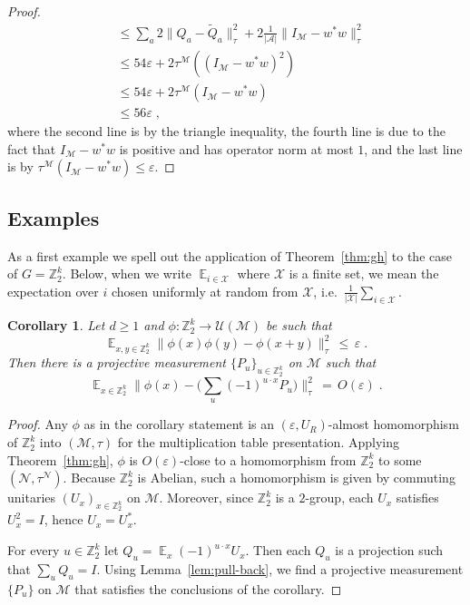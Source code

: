 \documentclass[11pt]{article}
\newtheorem{corollary}[theorem]{Corollary}
\theoremstyle{definition}
\newcommand{\Id}{\ensuremath{I}}
\DeclareMathOperator*{\Expectation}{\mathbb{E}}
\newcommand{\Es}[1]{\Expectation_{#1}}
\newcommand{\C}{\ensuremath{\mathbb{C}}}
\newcommand{\Z}{\ensuremath{\mathbb{Z}}}
\newcommand{\mA}{\ensuremath{\mathcal{A}}}
\newcommand{\mM}{\ensuremath{\mathcal{M}}}
\newcommand{\mU}{\ensuremath{\mathcal{U}}}
\newcommand{\mX}{\ensuremath{\mathcal{X}}}
\newcommand{\eps}{\varepsilon}
\newcommand{\mN}{\mathcal{N}}
\begin{document}
\begin{proof}
\begin{align*}
&\leq  \sum_a 2\big\|{Q}_a - \tilde{Q}_a\big\|_\tau^2  + 2\frac{1}{|\mA|}\big\|I_\mM - w^* w\big\|_\tau^2 \\
&\leq 54 \eps + 2 \tau^\mM( (I_\mM - w^* w)^2 ) \\
&\leq 54 \eps + 2 \tau^\mM(I_\mM - w^* w ) \\
&\leq 56 \eps\;,
\end{align*}
where the second line is by the triangle inequality, the fourth line is due to the fact that $I_\mM - w^* w$ is positive and has operator norm at most $1$, and the last line is by $\tau^\mM(I_\mM - w^* w ) \leq \eps$.
\end{proof}


\subsection{Examples}

As a first example we spell out the application of Theorem~\ref{thm:gh} to the case of $G=\Z_2^k$. 
Below, when we write $\Es{i\in \mX}$ where $\mX$ is a finite set, we mean the expectation over $i$ chosen uniformly at random from $\mX$, i.e.\ $\frac{1}{|\mX|} \sum_{i\in \mX}$. 

\begin{corollary}\label{cor:lin-test} %
Let $d\geq 1$ and $\phi:\Z_2^k \to \mU(\mM)$ be such that 
\[ \Es{x,y\in \Z_2^k} \big\| \phi(x)\phi(y)-\phi(x+y) \big\|_{\tau}^2 \,\leq\,\eps\;.\]
Then there is a %
projective measurement $\{P_u\}_{u\in \Z_2^k}$ on $\mM$ such that 
\[ \Es{x\in \Z_2^k} \Big\| \phi(x) -\Big(\sum_u (-1)^{u\cdot x} P_u\Big)  \Big\|_{\tau}^2 \,=\, O(\eps)\;.\]
\end{corollary} 

\begin{proof}
Any $\phi$ as in the corollary statement is an $(\eps,U_R)$-almost homomorphism of $\Z_2^k$ into $(\mM,\tau)$ for the multiplication table presentation. Applying Theorem~\ref{thm:gh}, $\phi$ is $O(\eps)$-close to a homomorphism from $\Z_2^k$ to some $(\mN,\tau^\mN)$. Because $\Z_2^k$ is Abelian, such a homomorphism is given by commuting unitaries $(U_x)_{x\in\Z_2^k}$ on $\mM$. Moreover, since $\Z_2^k$ is a $2$-group, each $U_x$ satisfies $U_x^2=\Id$, hence $U_x=U_x^*$.

For every $u\in  \Z_2^k$ let $Q_u = \Es{x} (-1)^{u\cdot x} U_x$. Then each $Q_u$ is a projection such that $\sum_u Q_u=\Id$. Using Lemma~\ref{lem:pull-back}, we find a projective measurement $\{P_u\}$ on $\mM$ that satisfies the conclusions of the corollary. 
\end{proof}
\end{document}
